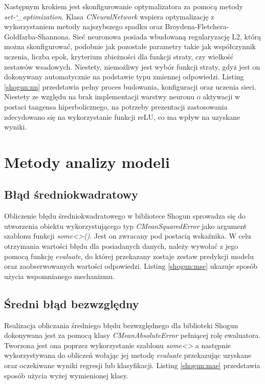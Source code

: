 Następnym krokiem jest skonfigurowanie optymalizatora za pomocą metody \textit{set-\char`_optimization}. Klasa \textit{CNeuralNetwork} wspiera optymalizację z wykorzystaniem metody najszybszego spadku oraz Broydena-Fletchera-Goldfarba-Shannona. Sieć neuronowa posiada wbudowaną regularyzację L2, którą można skonfigurować, podobnie jak pozostałe parametry takie jak współczynnik uczenia, liczba epok, kryterium zbieżności dla funkcji straty, czy wielkość zestawów wsadowych. Niestety, niemożliwy jest wybór funkcji straty, gdyż jest on dokonywany automatycznie na podstawie typu zmiennej odpowiedzi. Listing \ref{shogun:nn} przedstawia pełny proces budowania, konfiguracji oraz uczenia sieci. Niestety ze względu na brak implementacji warstwy neuronu o aktywacji w postaci tangensa hiperbolicznego, na potrzeby prezentacji zastosowania zdecydowano się na wykorzystanie funkcji reLU, co ma wpływ na uzyskane wyniki.


\section{Metody analizy modeli}

\subsection{Błąd średniokwadratowy}

Obliczenie błędu średniokwadratowego w bibliotece Shogun sprowadza się do utworzenia obiektu wykorzystującego typ \textit{CMeanSquaredError} jako argument szablonu funkcji \textit{some<>()}. Jest on zwracany pod postacią wskaźnika. W celu otrzymania wartości błędu dla posiadanych danych, należy wywołać z jego pomocą funkcję \textit{evaluate}, do której przekazany zostaje zestaw predykcji modelu oraz zaobserwowanych wartości odpowiedzi. Listing \ref{shogun:mse} ukazuje sposób użycia wspomnianego mechanizmu.


\subsection{Średni błąd bezwzględny}

Realizacja obliczania średniego błędu bezwzględnego dla biblioteki Shogun dokonywana jest za pomocą klasy \textit{CMeanAbsoluteError} pełniącej rolę ewaluatora. Tworzona jest ona poprzez wykorzystanie szablonu \textit{some<>} a następnie wykorzystywana do obliczeń wołając jej metodę \textit{evaluate} przekazując uzyskane oraz oczekiwane wyniki regresji lub klasyfikacji. Listing \ref{shogun:mae} przedstawia sposób użycia wyżej wymienionej klasy.

